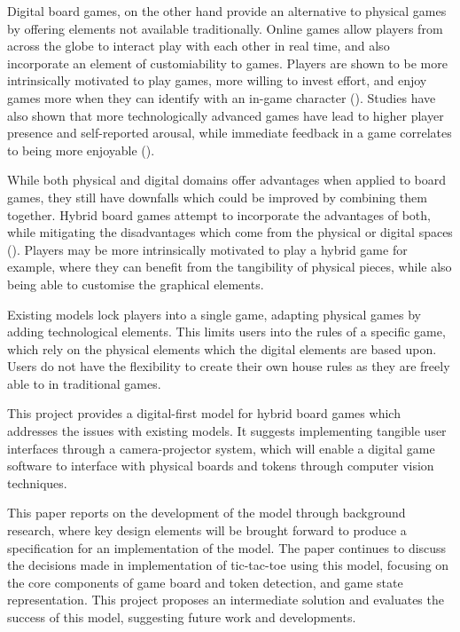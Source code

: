 \documentclass[12pt]{article}
\begin{document}
Digital board games, on the other hand provide an alternative to physical games by offering elements not available traditionally. 
Online games allow players from across the globe to interact play with each other in real time, and also incorporate an element of customiability to games. 
Players are shown to be more intrinsically motivated to play games, more willing to invest effort, and enjoy games more when they can identify with an in-game character (\cite{birk2016fostering}). 
Studies have also shown that more technologically advanced games have lead to higher player presence and self-reported arousal, while immediate feedback in a game correlates to being more enjoyable (\cite{boyle2012engagement}).

While both physical and digital domains offer advantages when applied to board games, they still have downfalls which could be improved by combining them together. 
Hybrid board games attempt to incorporate the advantages of both, while mitigating the disadvantages which come from the physical or digital spaces (\cite{park2017hybrid}).
Players may be more intrinsically motivated to play a hybrid game for example, where they can benefit from the tangibility of physical pieces, while also being able to customise the graphical elements. 

Existing models lock players into a single game, adapting physical games by adding technological elements. This limits users into the rules of a specific game, which rely on the physical elements which the digital elements are based upon. 
Users do not have the flexibility to create their own house rules as they are freely able to in traditional games.

This project provides a digital-first model for hybrid board games which addresses the issues with existing models. It suggests implementing tangible user interfaces through a camera-projector system, which will enable a digital game software to interface with physical boards and tokens through computer vision techniques. 

This paper reports on the development of the model through background research, where key design elements will be brought forward to produce a specification for an implementation of the model. 
The paper continues to discuss the decisions made in implementation of tic-tac-toe using this model, focusing on the core components of game board and token detection, and game state representation. 
This project proposes an intermediate solution and evaluates the success of this model, suggesting future work and developments. 
\end{document}
